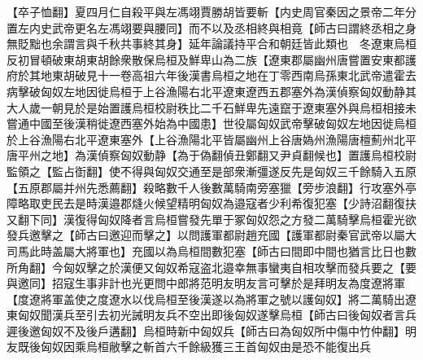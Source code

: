 【卒子恤翻】夏四月仁自殺平與左馮翊賈勝胡皆要斬【内史周官秦因之景帝二年分置左内史武帝更名左馮翊要與腰同】而不以及丞相終與相竟【師古曰謂終丞相之身無貶黜也余謂言與千秋共事終其身】延年論議持平合和朝廷皆此類也　冬遼東烏桓反初冒頓破東胡東胡餘衆散保烏桓及鮮卑山為二族【遼東郡屬幽州唐嘗置安東都護府於其地東胡破見十一卷高祖六年後漢書烏桓之地在丁零西南烏孫東北武帝遣霍去病擊破匈奴左地因徙烏桓于上谷漁陽右北平遼東遼西五郡塞外為漢偵察匈奴動静其大人歲一朝見於是始置護烏桓校尉秩比二千石鮮卑先遠竄于遼東塞外與烏桓相接未嘗通中國至後漢稍徙遼西塞外始為中國患】世役屬匈奴武帝擊破匈奴左地因徙烏桓於上谷漁陽右北平遼東塞外【上谷漁陽北平皆屬幽州上谷唐媯州漁陽唐檀薊州北平唐平州之地】為漢偵察匈奴動静【為于偽翻偵丑鄭翻又尹貞翻候也】置護烏桓校尉監領之【監占衘翻】使不得與匈奴交通至是部衆漸彊遂反先是匈奴三千餘騎入五原【五原郡屬并州先悉薦翻】殺略數千人後數萬騎南旁塞獵【旁步浪翻】行攻塞外亭障略取吏民去是時漢邉郡熢火候望精明匈奴為邉寇者少利希復犯塞【少詩沼翻復扶又翻下同】漢復得匈奴降者言烏桓嘗發先單于冢匈奴怨之方發二萬騎擊烏桓霍光欲發兵邀擊之【師古曰邀迎而擊之】以問護軍都尉趙充國【護軍都尉秦官武帝以屬大司馬此時盖屬大將軍也】充國以為烏桓間數犯塞【師古曰間即中間也猶言比日也數所角翻】今匈奴擊之於漢便又匈奴希寇盗北邉幸無事蠻夷自相攻擊而發兵要之【要與邀同】招寇生事非計也光更問中郎將范明友明友言可擊於是拜明友為度遼將軍【度遼將軍盖使之度遼水以伐烏桓至後漢遂以為將軍之號以護匈奴】將二萬騎出遼東匈奴聞漢兵至引去初光誡明友兵不空出即後匈奴遂擊烏桓【師古曰後匈奴者言兵遲後邀匈奴不及後戶遘翻】烏桓時新中匈奴兵【師古曰為匈奴所中傷中竹仲翻】明友既後匈奴因乘烏桓敝擊之斬首六千餘級獲三王首匈奴由是恐不能復出兵

